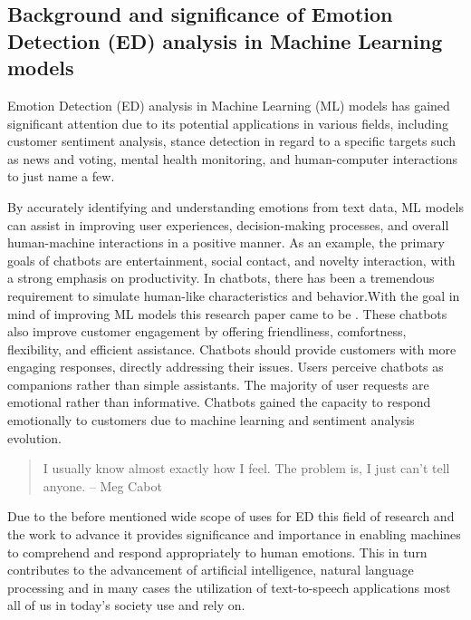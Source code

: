 \documentclass[11pt]{article}
\begin{document}
\subsection{Background and significance of Emotion Detection (ED) analysis in Machine Learning models}
Emotion Detection (ED) analysis in Machine Learning (ML) models has gained significant attention due to its potential applications in various fields, including customer sentiment analysis, stance detection in regard to a specific targets such as news and voting\cite{mascarell-etal-2021-stance}, mental health monitoring\cite{Colonnello}, and human-computer interactions to just name a few.

By accurately identifying and understanding emotions from text data, ML models can assist in improving user experiences, decision-making processes, and overall human-machine interactions in a positive manner\cite{Colonnello, mascarell-etal-2021-stance}. As an example, the primary goals of chatbots are entertainment, social contact, and novelty interaction, with a strong emphasis on productivity. In chatbots, there has been a tremendous requirement to simulate human-like characteristics and behavior.With the goal in mind of improving ML models this research paper came to be \cite{emotion-detection-literature-review}. These chatbots also improve customer engagement by offering friendliness, comfortness, flexibility, and efficient assistance. Chatbots should provide customers with more engaging responses, directly addressing their issues. Users perceive chatbots as companions rather than simple assistants. The majority of user requests are emotional rather than informative. Chatbots gained the capacity to respond emotionally to customers due to machine learning and sentiment analysis evolution\cite{chatbot-cognitive-awareness}.

\begin{quote}
    I usually know almost exactly how I feel. The problem is, I just can’t tell anyone.
    \flushright -- Meg Cabot
\end{quote}

Due to the before mentioned wide scope of uses for ED this field of research and the work to advance it provides significance and importance in enabling machines to comprehend and respond appropriately to human emotions. This in turn contributes to the advancement of artificial intelligence, natural language processing and in many cases the utilization of text-to-speech applications most all of us in today's society use and rely on.
\end{document}
